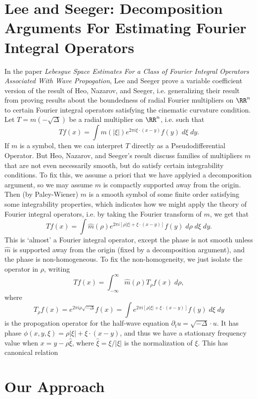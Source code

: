 \chapter{Lee and Seeger: Decomposition Arguments For Estimating Fourier Integral Operators}

In the paper \emph{Lebesgue Space Estimates For a Class of Fourier Integral Operators Associated With Wave Propogation}, Lee and Seeger prove a variable coefficient version of the result of Heo, Nazarov, and Seeger, i.e. generalizing their result from proving results about the boundedness of radial Fourier multipliers on $\RR^n$ to certain Fourier integral operators satisfying the cinematic curvature condition. Let $T = m(-\sqrt{\Delta})$ be a radial multiplier on $\RR^n$, i.e. such that
%
\[ T f(x) = \int m(|\xi|) e^{2 \pi i \xi \cdot (x - y)} f(y)\; d\xi\; dy. \]
%
If $m$ is a symbol, then we can interpret $T$ directly as a Pseudodifferential Operator. But Heo, Nazarov, and Seeger's result discuss families of multipliers $m$ that are not even necessarily smooth, but do satisfy certain integrability conditions. To fix this, we assume a priori that we have applyied a decomposition argument, so we may assume $m$ is compactly supported away from the origin. Then (by Paley-Wiener) $\widehat{m}$ is a smooth symbol of some finite order satisfying some integrability properties, which indicates how we might apply the theory of Fourier integral operators, i.e. by taking the Fourier transform of $m$, we get that
%
\[ Tf(x) = \int \widehat{m}(\rho) e^{2 \pi i [\rho |\xi| + \xi \cdot (x-y)]} f(y)\; d\rho\; d\xi\; dy. \]
%
This is `almost' a Fourier integral operator, except the phase is not smooth unless $\widehat{m}$ is supported away from the origin (fixed by a decomposition argument), and the phase is non-homogeneous. To fix the non-homogeneity, we just isolate the operator in $\rho$, writing
%
\[ Tf(x) = \int_{-\infty}^\infty \widehat{m}(\rho) T_\rho f(x)\; d\rho, \]
%
where
%
\[ T_\rho f(x) = e^{2 \pi i \rho \sqrt{-\Delta}} f(x) = \int e^{2 \pi i [\rho |\xi| + \xi \cdot (x - y)]} f(y)\; d\xi\; dy \]
%
is the propogation operator for the half-wave equation $\partial_t u = \sqrt{-\Delta} \cdot u$. It has phase $\phi(x,y,\xi) = \rho |\xi| + \xi \cdot (x - y)$, and thus we have a stationary frequency value when $x = y - \rho \widehat{\xi}$, where $\widehat{\xi} = \xi / |\xi|$ is the normalization of $\xi$. This has canonical relation



\chapter{Our Approach}

